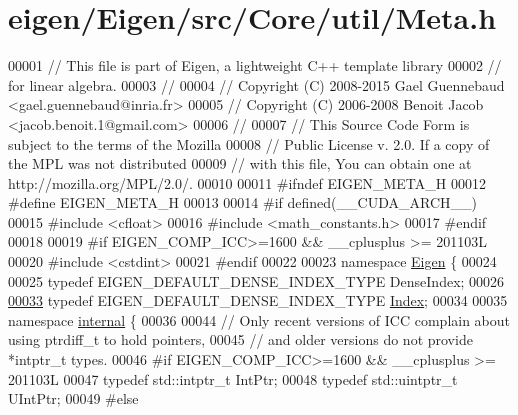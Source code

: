 \hypertarget{eigen_2_eigen_2src_2_core_2util_2_meta_8h_source}{}\section{eigen/\+Eigen/src/\+Core/util/\+Meta.h}
\label{eigen_2_eigen_2src_2_core_2util_2_meta_8h_source}

\begin{DoxyCode}
00001 \textcolor{comment}{// This file is part of Eigen, a lightweight C++ template library}
00002 \textcolor{comment}{// for linear algebra.}
00003 \textcolor{comment}{//}
00004 \textcolor{comment}{// Copyright (C) 2008-2015 Gael Guennebaud <gael.guennebaud@inria.fr>}
00005 \textcolor{comment}{// Copyright (C) 2006-2008 Benoit Jacob <jacob.benoit.1@gmail.com>}
00006 \textcolor{comment}{//}
00007 \textcolor{comment}{// This Source Code Form is subject to the terms of the Mozilla}
00008 \textcolor{comment}{// Public License v. 2.0. If a copy of the MPL was not distributed}
00009 \textcolor{comment}{// with this file, You can obtain one at http://mozilla.org/MPL/2.0/.}
00010 
00011 \textcolor{preprocessor}{#ifndef EIGEN\_META\_H}
00012 \textcolor{preprocessor}{#define EIGEN\_META\_H}
00013 
00014 \textcolor{preprocessor}{#if defined(\_\_CUDA\_ARCH\_\_)}
00015 \textcolor{preprocessor}{#include <cfloat>}
00016 \textcolor{preprocessor}{#include <math\_constants.h>}
00017 \textcolor{preprocessor}{#endif}
00018 
00019 \textcolor{preprocessor}{#if EIGEN\_COMP\_ICC>=1600 &&  \_\_cplusplus >= 201103L}
00020 \textcolor{preprocessor}{#include <cstdint>}
00021 \textcolor{preprocessor}{#endif}
00022 
00023 \textcolor{keyword}{namespace }\hyperlink{namespace_eigen}{Eigen} \{
00024 
00025 \textcolor{keyword}{typedef} EIGEN\_DEFAULT\_DENSE\_INDEX\_TYPE DenseIndex;
00026 
\hyperlink{namespace_eigen_a62e77e0933482dafde8fe197d9a2cfde}{00033} \textcolor{keyword}{typedef} EIGEN\_DEFAULT\_DENSE\_INDEX\_TYPE \hyperlink{namespace_eigen_a62e77e0933482dafde8fe197d9a2cfde}{Index};
00034 
00035 \textcolor{keyword}{namespace }\hyperlink{namespaceinternal}{internal} \{
00036 
00044 \textcolor{comment}{// Only recent versions of ICC complain about using ptrdiff\_t to hold pointers,}
00045 \textcolor{comment}{// and older versions do not provide *intptr\_t types.}
00046 \textcolor{preprocessor}{#if EIGEN\_COMP\_ICC>=1600 &&  \_\_cplusplus >= 201103L}
00047 \textcolor{keyword}{typedef} std::intptr\_t  IntPtr;
00048 \textcolor{keyword}{typedef} std::uintptr\_t UIntPtr;
00049 \textcolor{preprocessor}{#else}

\end{DoxyCode}
